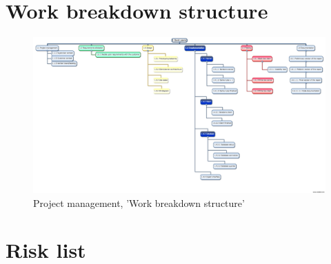 \section{Work breakdown structure}

\begin{figure}[H]
  \centering
    \includegraphics[width=1.0\textwidth]{img/wbs.jpeg}
  \caption{Project management, 'Work breakdown structure'} 
  \label{fig:WBS}
\end{figure}


\section{Risk list}


